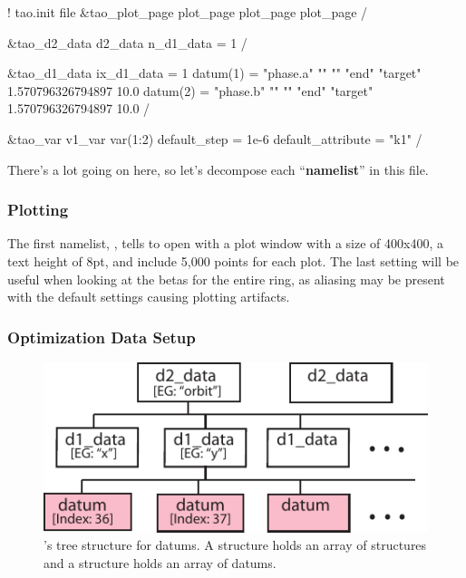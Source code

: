 \documentclass{hitec}     %
\begin{document}
\begin{code}
! tao.init file
&tao_plot_page                    
  plot_page%
  plot_page%
  plot_page%
/

&tao_d2_data                      
  d2_data%
  n_d1_data = 1
/

&tao_d1_data
  ix_d1_data = 1
  datum(1) = "phase.a" "" "" "end" "target" 1.570796326794897 10.0
  datum(2) = "phase.b" "" "" "end" "target" 1.570796326794897 10.0
/

&tao_var
  v1_var%
  var(1:2)%
  default_step = 1e-6
  default_attribute = "k1"
/
\end{code}

There's a lot going on here, so let's decompose each ``\textbf{namelist}'' in this file.

\subsubsection{Plotting}

The first namelist, , tells \tao to open with a plot window with a size of 400x400, a text height of 8pt, and include 5,000 points for each plot. The last setting will be useful when looking at the betas for the entire ring, as aliasing may be present with the default settings causing plotting artifacts. 

\subsubsection{Optimization Data Setup}

\begin{figure}[h!]
  \centering
  \includegraphics*[width=0.5\columnwidth]{figures/data-tree.pdf}
  \caption{\label{f:datatree} \tao's tree structure for datums.
  A  structure holds an array of  structures and
a  structure holds an array of datums.}
\end{figure}
\end{document}
